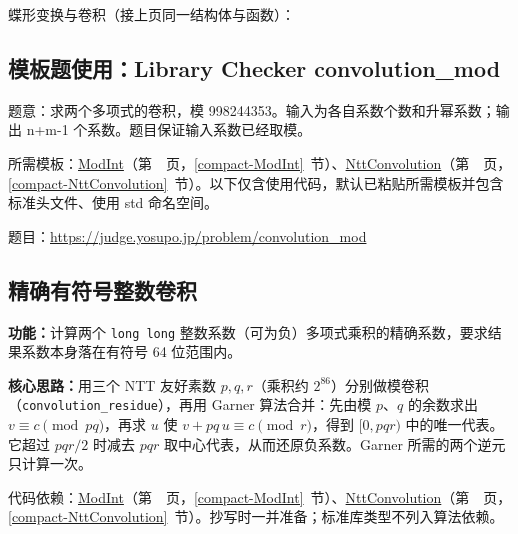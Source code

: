 \Needspace{453pt}



\newpage

\noindent 蝶形变换与卷积（接上页同一结构体与函数）：



\Needspace{315pt}

\subsection*{模板题使用：Library Checker convolution\_mod}

\label{usage-example-16}

题意：求两个多项式的卷积，模 998244353。输入为各自系数个数和升幂系数；输出 n+m-1 个系数。题目保证输入系数已经取模。

所需模板：\hyperref[compact-ModInt]{ModInt}（第~\pageref{compact-ModInt}~页，\ref{compact-ModInt}~节）、\hyperref[compact-NttConvolution]{NttConvolution}（第~\pageref{compact-NttConvolution}~页，\ref{compact-NttConvolution}~节）。以下仅含使用代码，默认已粘贴所需模板并包含标准头文件、使用 std 命名空间。

题目：\url{https://judge.yosupo.jp/problem/convolution_mod}



\Needspace{603pt}

\subsection{精确有符号整数卷积}\label{compact-convolution_i64}

\noindent\textbf{功能：}\allowbreak 计算两个 \texttt{long long} 整数系数（可为负）多项式乘积的精确系数，要求结果系数本身落在有符号 64 位范围内。

\textbf{核心思路：}\allowbreak 用三个 NTT 友好素数 $p,q,r$（乘积约 $2^{86}$）分别做模卷积（\texttt{convolution\_residue}），再用 Garner 算法合并：先由模 $p$、$q$ 的余数求出 $v\equiv c\pmod{pq}$，再求 $u$ 使 $v+pq\,u\equiv c\pmod r$，得到 $[0,pqr)$ 中的唯一代表。它超过 $pqr/2$ 时减去 $pqr$ 取中心代表，从而还原负系数。Garner 所需的两个逆元只计算一次。

代码依赖：\hyperref[compact-ModInt]{ModInt}（第~\pageref{compact-ModInt}~页，\ref{compact-ModInt}~节）、\hyperref[compact-NttConvolution]{NttConvolution}（第~\pageref{compact-NttConvolution}~页，\ref{compact-NttConvolution}~节）。抄写时一并准备；标准库类型不列入算法依赖。

